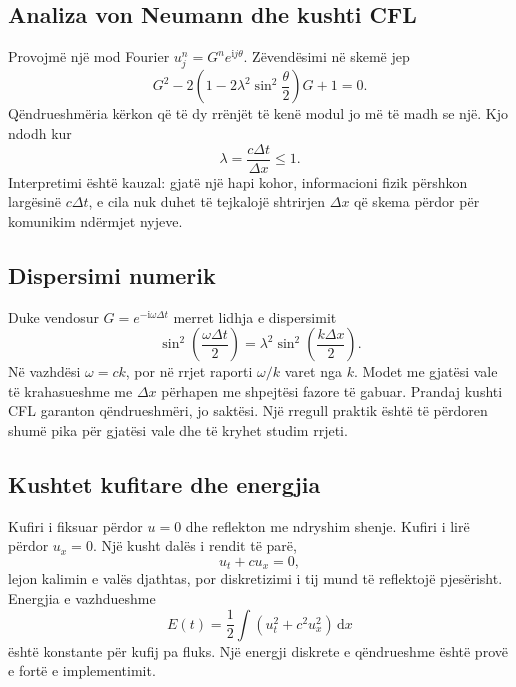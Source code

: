 \documentclass[11pt,oneside,openany]{book}
\newcommand{\dd}{\,\mathrm{d}}
\begin{document}
\subsection{Analiza von Neumann dhe kushti CFL}
Provojmë një mod Fourier $u_j^n=G^ne^{\mathrm{i}j\theta}$. Zëvendësimi në skemë jep
\begin{equation}
 G^2-2\left(1-2\lambda^2\sin^2\frac\theta2\right)G+1=0.
\end{equation}
Qëndrueshmëria kërkon që të dy rrënjët të kenë modul jo më të madh se një. Kjo ndodh kur
\begin{equation}
 \lambda=\frac{c\Delta t}{\Delta x}\le1.
\end{equation}
Interpretimi është kauzal: gjatë një hapi kohor, informacioni fizik përshkon largësinë $c\Delta t$, e cila nuk duhet të tejkalojë shtrirjen $\Delta x$ që skema përdor për komunikim ndërmjet nyjeve.

\subsection{Dispersimi numerik}
Duke vendosur $G=e^{-\mathrm{i}\omega\Delta t}$ merret lidhja e dispersimit
\begin{equation}
 \sin^2\left(\frac{\omega\Delta t}{2}\right)
 =\lambda^2\sin^2\left(\frac{k\Delta x}{2}\right).
\end{equation}
Në vazhdësi $\omega=ck$, por në rrjet raporti $\omega/k$ varet nga $k$. Modet me gjatësi vale të krahasueshme me $\Delta x$ përhapen me shpejtësi fazore të gabuar. Prandaj kushti CFL garanton qëndrueshmëri, jo saktësi. Një rregull praktik është të përdoren shumë pika për gjatësi vale dhe të kryhet studim rrjeti.

\subsection{Kushtet kufitare dhe energjia}
Kufiri i fiksuar përdor $u=0$ dhe reflekton me ndryshim shenje. Kufiri i lirë përdor $u_x=0$. Një kusht dalës i rendit të parë,
\begin{equation}
 u_t+cu_x=0,
\end{equation}
lejon kalimin e valës djathtas, por diskretizimi i tij mund të reflektojë pjesërisht. Energjia e vazhdueshme
\begin{equation}
 E(t)=\frac12\int\left(u_t^2+c^2u_x^2\right)\dd x
\end{equation}
është konstante për kufij pa fluks. Një energji diskrete e qëndrueshme është provë e fortë e implementimit.
\end{document}
